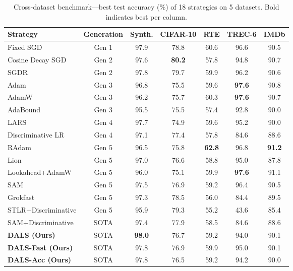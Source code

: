 \documentclass[a4paper,fleqn]{cas-dc}
\begin{document}
\begin{table}[width=\textwidth,cols=7,pos=h]
\caption{Cross-dataset benchmark---best test accuracy (\%) of 18 strategies on 5 datasets. Bold indicates best per column.}\label{tab:benchmark}
\small
\begin{tabular*}{\tblwidth}{@{} L C C C C C C @{}}
\toprule
Strategy & Generation & Synth. & CIFAR-10 & RTE & TREC-6 & IMDb \\
\midrule
Fixed SGD & Gen 1 & 97.9 & 78.8 & 60.6 & 96.6 & 90.5 \\
Cosine Decay SGD & Gen 2 & 97.6 & \textbf{80.2} & 57.8 & 94.8 & 90.7 \\
SGDR & Gen 2 & 97.8 & 79.7 & 59.9 & 96.2 & 90.6 \\
Adam & Gen 3 & 96.8 & 75.5 & 59.6 & \textbf{97.6} & 90.8 \\
AdamW & Gen 3 & 96.2 & 75.7 & 60.3 & \textbf{97.6} & 90.7 \\
AdaBound & Gen 3 & 95.5 & 75.5 & 57.4 & 92.8 & 90.0 \\
LARS & Gen 4 & 97.7 & 74.9 & 59.6 & 95.2 & 90.0 \\
Discriminative LR & Gen 4 & 97.1 & 77.4 & 57.8 & 84.6 & 88.6 \\
RAdam & Gen 5 & 96.5 & 75.8 & \textbf{62.8} & 96.8 & \textbf{91.2} \\
Lion & Gen 5 & 97.0 & 76.6 & 58.8 & 95.0 & 87.8 \\
Lookahead+AdamW & Gen 5 & 96.0 & 75.1 & 59.9 & \textbf{97.6} & 91.1 \\
SAM & Gen 5 & 97.5 & 76.9 & 59.2 & 96.4 & 90.5 \\
Grokfast & Gen 5 & 97.3 & 78.5 & 56.0 & 84.4 & 89.5 \\
STLR+Discriminative & Gen 5 & 95.9 & 79.3 & 55.2 & 43.6 & 85.4 \\
SAM+Discriminative & SOTA & 97.4 & 77.9 & 58.5 & 84.6 & 88.6 \\
\midrule
\textbf{DALS (Ours)} & SOTA & \textbf{98.0} & 76.7 & 59.2 & 94.0 & 90.1 \\
\textbf{DALS-Fast (Ours)} & SOTA & 97.8 & 76.9 & 59.9 & 95.0 & 90.1 \\
\textbf{DALS-Acc (Ours)} & SOTA & 97.8 & 76.5 & 59.2 & 94.2 & 90.0 \\
\bottomrule
\end{tabular*}
\end{table}
\end{document}
